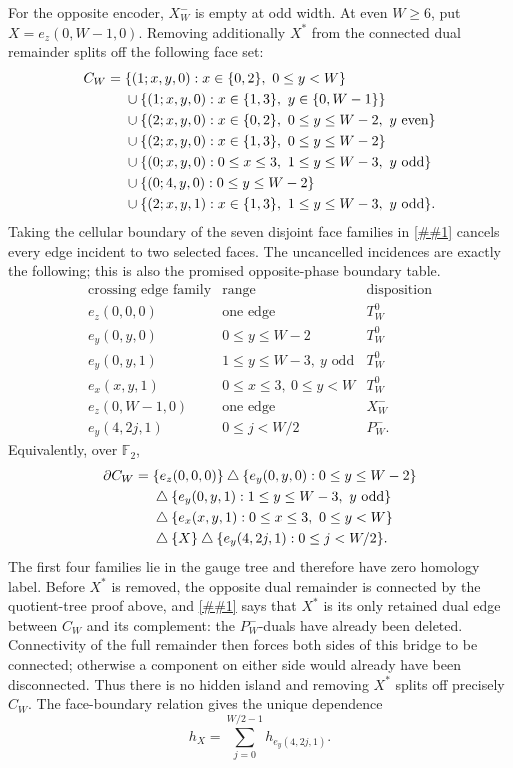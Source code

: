 \documentclass[11pt]{article}
\newcommand{\cref}[1]{\autoref{##1}}%
\newcommand{\Ftwo}{\mathbb F_2}
\begin{document}
For the opposite encoder, \(X_W^-\) is empty at odd width.  At even
\(W\ge6\), put \(X=e_z(0,W-1,0)\).  Removing additionally \(X^*\) from the
connected dual remainder splits off the following face set:
\begin{align}\label{eq:opposite-cut}
 C_W={}&\{(1;x,y,0):x\in\{0,2\},\ 0\le y<W\}\notag\\
 &\cup\{(1;x,y,0):x\in\{1,3\},\ y\in\{0,W-1\}\}\notag\\
 &\cup\{(2;x,y,0):x\in\{0,2\},\ 0\le y\le W-2,\ y\text{ even}\}\notag\\
 &\cup\{(2;x,y,0):x\in\{1,3\},\ 0\le y\le W-2\}\notag\\
 &\cup\{(0;x,y,0):0\le x\le3,\ 1\le y\le W-3,\ y\text{ odd}\}\notag\\
 &\cup\{(0;4,y,0):0\le y\le W-2\}\notag\\
 &\cup\{(2;x,y,1):x\in\{1,3\},\ 1\le y\le W-3,\ y\text{ odd}\}.
\end{align}
Taking the cellular boundary of the seven disjoint face families in
\cref{eq:opposite-cut} cancels every edge incident to two selected faces.
The uncancelled incidences are exactly the following; this is also the
promised opposite-phase boundary table.
\[
\begin{array}{c|c|c}
\text{crossing edge family}&\text{range}&\text{disposition}\\ \hline
e_z(0,0,0)&\text{one edge}&T_W^0\\
e_y(0,y,0)&0\le y\le W-2&T_W^0\\
e_y(0,y,1)&1\le y\le W-3,\ y\text{ odd}&T_W^0\\
e_x(x,y,1)&0\le x\le3,\ 0\le y<W&T_W^0\\
e_z(0,W-1,0)&\text{one edge}&X_W^-\\
e_y(4,2j,1)&0\le j<W/2&P_W^-.
\end{array}
\]
Equivalently, over \(\Ftwo\),
\begin{align}\label{eq:opposite-boundary}
 \partial C_W={}&\{e_z(0,0,0)\}
 \mathbin\triangle\{e_y(0,y,0):0\le y\le W-2\}\notag\\
 &\mathbin\triangle\{e_y(0,y,1):1\le y\le W-3,\ y\text{ odd}\}\notag\\
 &\mathbin\triangle\{e_x(x,y,1):0\le x\le3,\ 0\le y<W\}\notag\\
 &\mathbin\triangle\{X\}
 \mathbin\triangle\{e_y(4,2j,1):0\le j<W/2\}.
\end{align}
The first four families lie in the gauge tree and therefore have zero
homology label.  Before \(X^*\) is removed, the opposite dual remainder is
connected by the quotient-tree proof above, and \cref{eq:opposite-boundary}
says that \(X^*\) is its only retained dual edge between \(C_W\) and its
complement: the \(P_W^-\)-duals have already been deleted.  Connectivity of
the full remainder then forces both sides of this bridge to be connected;
otherwise a component on either side would already have been disconnected.
Thus there is no hidden island and removing \(X^*\) splits off precisely
\(C_W\).  The face-boundary relation gives the unique dependence
\begin{equation}\label{eq:opposite-h-relation}
 h_X=\sum_{j=0}^{W/2-1}h_{e_y(4,2j,1)}.
\end{equation}
\end{document}
